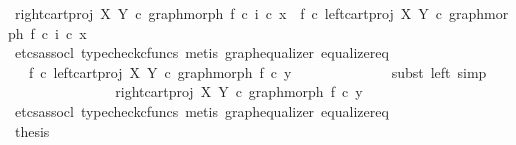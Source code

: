 \begin{isabellebody}
\ {\isachardoublequoteopen}right{\isacharunderscore}{\kern0pt}cart{\isacharunderscore}{\kern0pt}proj\ X\ Y\ {\isasymcirc}\isactrlsub c\ graph{\isacharunderscore}{\kern0pt}morph\ f\ {\isasymcirc}\isactrlsub c\ i\ {\isasymcirc}\isactrlsub c\ x{\isacharprime}{\kern0pt}\ {\isacharequal}{\kern0pt}\ f\ {\isasymcirc}\isactrlsub c\ left{\isacharunderscore}{\kern0pt}cart{\isacharunderscore}{\kern0pt}proj\ X\ Y\ {\isasymcirc}\isactrlsub c\ graph{\isacharunderscore}{\kern0pt}morph\ f\ {\isasymcirc}\isactrlsub c\ i\ {\isasymcirc}\isactrlsub c\ x{\isacharprime}{\kern0pt}{\isachardoublequoteclose}\isanewline
\ \ \ \ \ \ \ \ \ \ \ \ \isamarkupfalse%
\ {\isacharparenleft}{\kern0pt}etcs{\isacharunderscore}{\kern0pt}assocl{\isacharcomma}{\kern0pt}\ typecheck{\isacharunderscore}{\kern0pt}cfuncs{\isacharcomma}{\kern0pt}\ metis\ graph{\isacharunderscore}{\kern0pt}equalizer\ equalizer{\isacharunderscore}{\kern0pt}eq{\isacharparenright}{\kern0pt}\isanewline
\ \ \ \ \ \ \ \ \ \ \isamarkupfalse%
\ \isamarkupfalse%
\ {\isachardoublequoteopen}{\isachardot}{\kern0pt}{\isachardot}{\kern0pt}{\isachardot}{\kern0pt}\ {\isacharequal}{\kern0pt}\ f\ {\isasymcirc}\isactrlsub c\ left{\isacharunderscore}{\kern0pt}cart{\isacharunderscore}{\kern0pt}proj\ X\ Y\ {\isasymcirc}\isactrlsub c\ graph{\isacharunderscore}{\kern0pt}morph\ f\ {\isasymcirc}\isactrlsub c\ y{\isacharprime}{\kern0pt}{\isachardoublequoteclose}\isanewline
\ \ \ \ \ \ \ \ \ \ \ \ \isamarkupfalse%
\ {\isacharparenleft}{\kern0pt}subst\ left{\isacharcomma}{\kern0pt}\ simp{\isacharparenright}{\kern0pt}\isanewline
\ \ \ \ \ \ \ \ \ \ \isamarkupfalse%
\ \isamarkupfalse%
\ {\isachardoublequoteopen}{\isachardot}{\kern0pt}{\isachardot}{\kern0pt}{\isachardot}{\kern0pt}\ {\isacharequal}{\kern0pt}\ right{\isacharunderscore}{\kern0pt}cart{\isacharunderscore}{\kern0pt}proj\ X\ Y\ {\isasymcirc}\isactrlsub c\ graph{\isacharunderscore}{\kern0pt}morph\ f\ {\isasymcirc}\isactrlsub c\ y{\isacharprime}{\kern0pt}{\isachardoublequoteclose}\isanewline
\ \ \ \ \ \ \ \ \ \ \ \ \isamarkupfalse%
\ {\isacharparenleft}{\kern0pt}etcs{\isacharunderscore}{\kern0pt}assocl{\isacharcomma}{\kern0pt}\ typecheck{\isacharunderscore}{\kern0pt}cfuncs{\isacharcomma}{\kern0pt}\ metis\ graph{\isacharunderscore}{\kern0pt}equalizer\ equalizer{\isacharunderscore}{\kern0pt}eq{\isacharparenright}{\kern0pt}\isanewline
\ \ \ \ \ \ \ \ \ \ \isamarkupfalse%
\ \isamarkupfalse%
\ {\isacharquery}{\kern0pt}thesis\ \isamarkupfalse%

\end{isabellebody}
